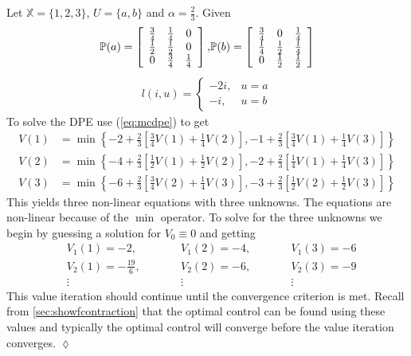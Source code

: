 \begin{example}%
\label{ex:valit}
Let $\mathbb{X}=\{1,2,3\}$, $U=\{a,b\}$ and $\alpha=\frac{2}{3}$.
Given
\begin{align*}
\begin{split}
\mathbb{P}(a) = \left[\begin{array}{c c c} \frac{3}{4} & \frac{1}{4} & 0 \\ \frac{1}{2} & \frac{1}{2} & 0 \\ 0 & \frac{3}{4} & \frac{1}{4} \end{array}\right],
\end{split}
\begin{split}
\mathbb{P} (b) = \left[\begin{array}{c c c} \frac{3}{4} & 0 & \frac{1}{4} \\ \frac{1}{4} & \frac{1}{2} & \frac{1}{4} \\ 0 & \frac{1}{2} & \frac{1}{2} \end{array}\right]
\end{split}
\end{align*}
\begin{align*}
l(i,u) = \begin{cases} -2i, & u=a \\ -i, & u=b \end{cases}
\end{align*}
To solve the DPE use (\ref{eq:mcdpe}) to get
\begin{align*}
V(1) &= \min\left\lbrace-2+\frac{2}{3}\left[\frac{3}{4}V(1)+\frac{1}{4}V(2)\right], -1+\frac{2}{3}\left[\frac{3}{4}V(1)+\frac{1}{4}V(3)\right]\right\rbrace \\
V(2) &= \min\left\lbrace-4+\frac{2}{3}\left[\frac{1}{2}V(1)+\frac{1}{2}V(2)\right], -2+\frac{2}{3}\left[\frac{1}{4}V(1)+\frac{1}{4}V(3)\right]\right\rbrace \\
V(3) &= \min\left\lbrace-6+\frac{2}{3}\left[\frac{3}{4}V(2)+\frac{1}{4}V(3)\right], -3+\frac{2}{3}\left[\frac{1}{2}V(2)+\frac{1}{2}V(3)\right]\right\rbrace
\end{align*}
This yields three non-linear equations with three unknowns.
The equations are non-linear because of the $\min$ operator.
To solve for the three unknowns we begin by guessing a solution for $V_0\equiv0$ and getting
\begin{align*}
&V_1(1) = -2, &\qquad &V_1(2) = -4, &\qquad &V_1(3) = -6 \\
&V_2(1) = -\frac{19}{6}, &\qquad &V_2(2) = -6, &\qquad &V_2(3) = -9 \\
&\vdots &\qquad & \vdots &\qquad &\vdots
\end{align*}
This value iteration should continue until the convergence criterion is met.
Recall from \ref{sec:showfcontraction} that the optimal control can be found using these values and typically the optimal control will converge before the value iteration converges.
$\lozenge$
\end{example}


